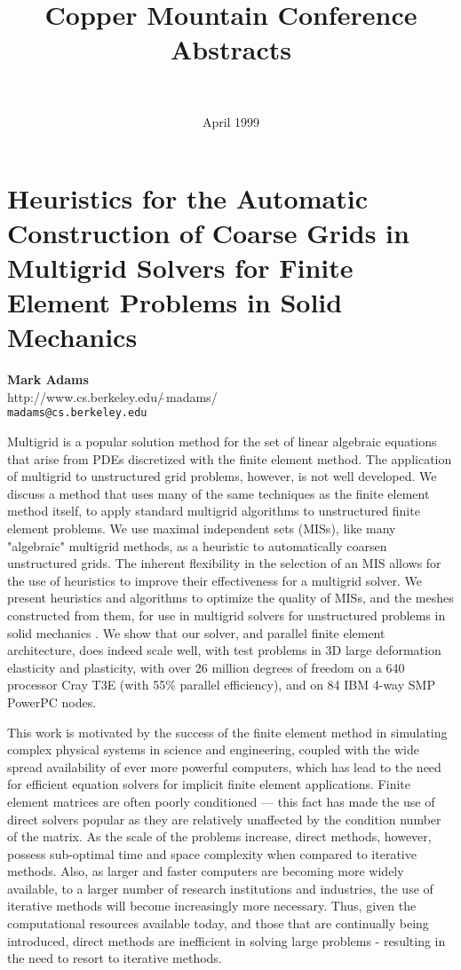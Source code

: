 \documentclass[11pt]{article}
\title{Copper Mountain Conference Abstracts}
\author{~ }
\date{April 1999}
\newcommand{\nextab}[4]{
	\section{#2}
	{\bf #1} \\ \nopagebreak
	{#3} \\ \nopagebreak
	{\tt #4} \nopagebreak
	}
\begin{document}
\maketitle

\nextab{Mark Adams}{Heuristics for the Automatic Construction of
	Coarse Grids in Multigrid Solvers for Finite
	Element Problems in Solid Mechanics}
	{http://www.cs.berkeley.edu/$\tilde{~}$madams/}
	{madams@cs.berkeley.edu}

Multigrid is a popular solution method for the set of linear algebraic
equations that arise from PDEs discretized with the finite element method.
The application of multigrid to unstructured grid problems, however, is
not well developed. We discuss a method that uses many of the same techniques
as the finite element method itself, to apply standard multigrid algorithms
to unstructured finite element problems. We use maximal independent sets
(MISs), like many "algebraic" multigrid methods, as a heuristic to
automatically
coarsen unstructured grids. The inherent flexibility in the selection of
an MIS allows for the use of heuristics to improve their effectiveness
for a multigrid solver. We present heuristics and algorithms to optimize
the quality of MISs, and the meshes constructed from them, for use in multigrid
solvers for unstructured problems in solid mechanics . We show that our
solver, and parallel finite element architecture, does indeed scale well,
with test problems in 3D large deformation elasticity and plasticity, with
over 26 million degrees of freedom on a 640 processor Cray T3E (with 55\%
parallel efficiency), and on 84 IBM 4-way SMP PowerPC nodes.

This work is motivated by the success of the finite element method in
simulating complex physical systems in science and engineering, coupled
with the wide spread availability of ever more powerful computers, which
has lead to the need for efficient equation solvers for implicit finite
element applications.  Finite element matrices are often poorly
conditioned ---
this fact has made the use of direct solvers popular as they are relatively
unaffected by the condition number of the matrix.  As the scale of
the problems increase, direct methods, however, possess sub-optimal time
and space complexity when compared to iterative methods.  Also, as
larger and faster computers are becoming more widely available, to a larger
number of research institutions and industries, the use of iterative methods
will become increasingly more necessary.  Thus, given the computational
resources available today, and those that are continually being introduced,
direct methods are inefficient in solving large problems - resulting in
the need to resort to iterative methods.
\end{document}
